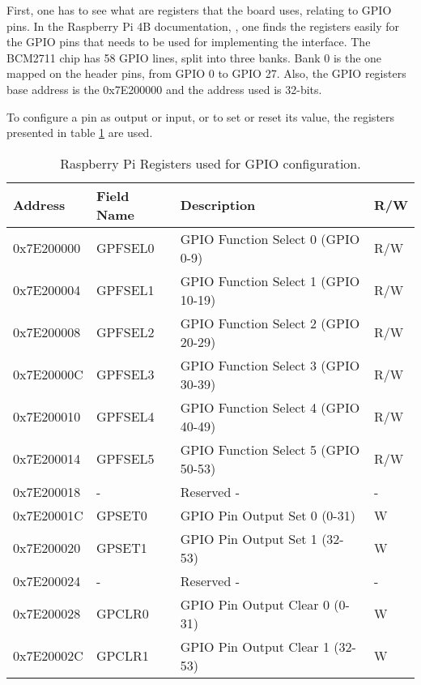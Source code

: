 First, one has to see what are registers that the board uses, relating to GPIO pins. In the Raspberry Pi 4B documentation, \cite{rpi_datasheet}, one finds the registers easily for the GPIO pins that needs to be used for implementing the interface. The BCM2711 chip has 58 GPIO lines, split into three banks. Bank 0 is the one mapped on the header pins, from GPIO 0 to GPIO 27. Also, the GPIO registers base address is the 0x7E200000 and the address used is 32-bits.

To configure a pin as output or input, or to set or reset its value, the registers presented in table \ref{table:gpio_reg} are used.

\begin{table}[H]
	\centering
	\resizebox{\columnwidth}{!}
	{
		\begin{tabular}{|m{}|m{}|m{}|m{}|}
			\hline
			\textbf{Address} & \textbf{Field Name} & \textbf{Description} & \textbf{R/W}
			\\\hline\hline
			0x7E200000 & GPFSEL0 & GPIO Function Select 0 (GPIO 0-9) &  R/W
			\\\hline
			
			0x7E200004 & GPFSEL1 & GPIO Function Select 1 (GPIO 10-19) & R/W
			\\\hline
			
			0x7E200008 & GPFSEL2 & GPIO Function Select 2 (GPIO 20-29) & R/W
			\\\hline
			
			0x7E20000C & GPFSEL3 & GPIO Function Select 3 (GPIO 30-39) & R/W
			\\\hline
			
			0x7E200010 & GPFSEL4 & GPIO Function Select 4 (GPIO 40-49) & R/W
			\\\hline
			
			0x7E200014 & GPFSEL5 & GPIO Function Select 5 (GPIO 50-53) & R/W
			\\\hline
			
			0x7E200018 & - & Reserved - & -
			\\\hline
			
			0x7E20001C & GPSET0 & GPIO Pin Output Set 0 (0-31) & W
			\\\hline
			
			0x7E200020 & GPSET1 & GPIO Pin Output Set 1 (32-53) & W
			\\\hline
			
			0x7E200024 & - & Reserved - & -
			\\\hline
			
			0x7E200028 & GPCLR0 & GPIO Pin Output Clear 0 (0-31) & W
			\\\hline
			
			0x7E20002C & GPCLR1 & GPIO Pin Output Clear 1 (32-53) & W
			\\\hline			
		\end{tabular}
	}
	\caption{Raspberry Pi Registers used for GPIO configuration.}
	\label{table:gpio_reg}
\end{table}

